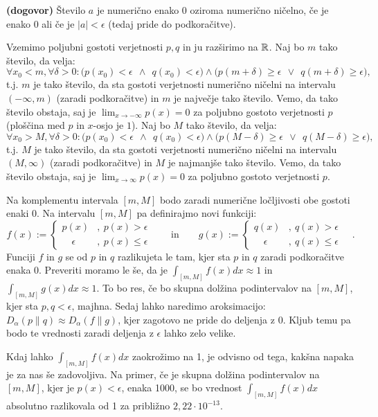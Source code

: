 \begin{opomba}
    \textbf{(dogovor)} Število $a$ je numerično enako $0$ oziroma numerično ničelno, če je enako $0$ ali če je $|a| < \epsilon$ (tedaj pride do podkoračitve).
\end{opomba}

Vzemimo poljubni gostoti verjetnosti $p, q$ in ju razširimo na $\mathbb{R}$. Naj bo $m$ tako število, da velja:
\begin{equation*}
    \forall x_0 < m, \forall \delta > 0:
    \Big(p(x_0) < \epsilon \ \  \wedge \ \  q(x_0) < \epsilon\Big)
    \wedge
    \Big(p(m + \delta) \geq \epsilon \ \  \vee \ \  q(m + \delta) \geq \epsilon\Big),
\end{equation*}
t.j. $m$ je tako število, da sta gostoti verjetnosti numerično ničelni na intervalu $(-\infty, m)$ (zaradi podkoračitve) in $m$ je največje tako število. Vemo, da tako število obstaja, saj je $\lim_{x \rightarrow -\infty} p(x) = 0$ za poljubno gostoto verjetnosti $p$ (ploščina med $p$ in $x$-osjo je $1$). Naj bo $M$ tako število, da velja:
\begin{equation*}
    \forall x_0 > M, \forall \delta > 0:
    \Big(p(x_0) < \epsilon \ \  \wedge \ \  q(x_0) < \epsilon\Big)
    \wedge
    \Big(p(M - \delta) \geq \epsilon \ \  \vee \ \  q(M - \delta) \geq \epsilon\Big),
\end{equation*}
t.j. $M$ je tako število, da sta gostoti verjetnosti numerično ničelni na intervalu $(M, \infty)$ (zaradi podkoračitve) in $M$ je najmanjše tako število. Vemo, da tako število obstaja, saj je $\lim_{x \rightarrow \infty} p(x) = 0$ za poljubno gostoto verjetnosti $p$.

Na komplementu intervala $[m, M]$ bodo zaradi numerične ločljivosti obe gostoti enaki 0. Na intervalu $[m, M]$ pa definirajmo novi funkciji:
\[
f(x) := 
\begin{cases}
    p(x) &, \  p(x) > \epsilon \\
    \quad \epsilon &, \  p(x) \leq \epsilon
\end{cases}
\quad \quad \text{in} \quad \quad
g(x) := 
\begin{cases}
    q(x) &, \  q(x) > \epsilon \\
    \quad \epsilon &, \  q(x) \leq \epsilon
\end{cases}
\quad .
\]
Funciji $f$ in $g$ se od $p$ in $q$ razlikujeta le tam, kjer sta $p$ in $q$ zaradi podkoračitve enaka 0. Preveriti moramo le še, da je $\int_{[m,M]} f(x) dx \approx 1$ in $\int_{[m,M]} g(x) dx \approx 1$. To bo res, če bo skupna dolžina podintervalov na $[m, M]$, kjer sta $p, q < \epsilon$, majhna. Sedaj lahko naredimo aroksimacijo: $D_\alpha(p \| q) \approx D_\alpha(f \| g)$, kjer zagotovo ne pride do deljenja z 0. Kljub temu pa bodo te vrednosti zaradi deljenja z $\epsilon$ lahko zelo velike.

\begin{opomba}
    Kdaj lahko $\int_{[m,M]} f(x) dx$ zaokrožimo na 1, je odvisno od tega, kakšna napaka je za nas še zadovoljiva. Na primer, če je skupna dolžina podintervalov na $[m,M]$, kjer je $p(x) < \epsilon$, enaka 1000, se bo vrednost $\int_{[m,M]} f(x) dx$ absolutno razlikovala od 1 za približno $2,22 \cdot 10^{-13}$.
\end{opomba}